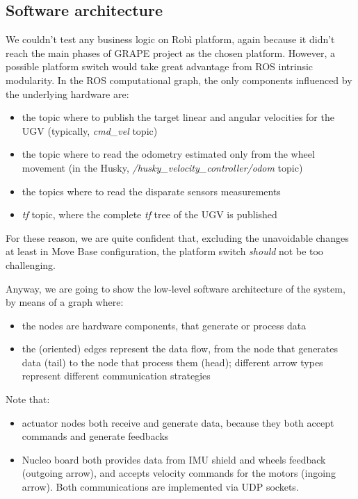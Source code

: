 \subsection{Software architecture}\label{subsec:robiSoftware}
We couldn't test any business logic on Robì platform, again because it didn't reach the main phases of \ac{GRAPE} project as the chosen platform. However, a possible platform switch would take great advantage from \ac{ROS} intrinsic modularity. In the \ac{ROS} computational graph, the only components influenced by the underlying hardware are:
\begin{itemize}
	\item the topic where to publish the target linear and angular velocities for the \ac{UGV} (typically, \textit{cmd\_vel} topic)
	\item the topic where to read the odometry estimated only from the wheel movement (in the Husky, \textit{/husky\_velocity\_controller/odom} topic)
	\item the topics where to read the disparate sensors measurements
	\item \textit{tf} topic, where the complete \textit{tf} tree of the \ac{UGV} is published
\end{itemize}
For these reason, we are quite confident that, excluding the unavoidable changes at least in Move Base configuration, the platform switch \textit{should} not be too challenging.

\par Anyway, we are going to show the low-level software architecture of the system, by means of a graph where:
\begin{itemize}
	\item the nodes are hardware components, that generate or process data
	\item the (oriented) edges represent the data flow, from the node that generates data (tail) to the node that process them (head); different arrow types represent different communication strategies
\end{itemize}
Note that:
\begin{itemize}
	\item  actuator nodes both receive and generate data, because they both accept commands and generate feedbacks
	\item Nucleo board both provides data from \ac{IMU} shield and wheels feedback (outgoing arrow), and accepts velocity commands for the motors (ingoing arrow). Both communications are implemented via UDP sockets. 
\end{itemize}


